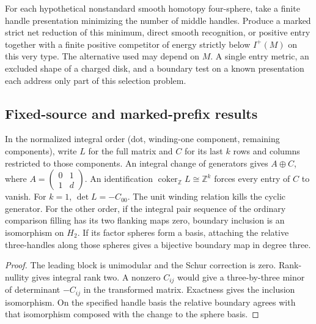 \begin{openproblem}
\label{ed04:coverage}
For each hypothetical nonstandard smooth homotopy four-sphere, take a
finite handle presentation minimizing the number of middle handles.
Produce a marked strict net reduction of this minimum, direct smooth
recognition, or positive entry together with a finite positive
competitor of energy strictly below $I^+(M)$ on this very type.
The alternative used may depend on $M$. A single entry metric, an
excluded shape of a charged disk, and a boundary test on a known
presentation each address only part of this selection problem.
\end{openproblem}

\subsection{Fixed-source and marked-prefix results}
\label{sec:ed04-fixed-source-results}

\begin{proposition}
\label{prop:ed04-integral-prefix}
\leanok
In the normalized integral order (dot, winding-one component, remaining
components), write $L$ for the full matrix and $C$ for its last $k$ rows
and columns restricted to those components. An integral change of generators
gives $A\oplus C$, where $A=\left(\begin{smallmatrix}0&1\\1&d\end{smallmatrix}\right)$.
An identification $\operatorname{coker}_{\mathbb Z}L\cong\mathbb Z^k$
forces every entry of $C$ to vanish. For $k=1$, $\det L=-C_{00}$.
The unit winding relation kills the cyclic generator. For the other order,
if the integral pair sequence of the ordinary comparison filling has its
two flanking maps zero, boundary inclusion is an isomorphism on $H_2$.
If its factor spheres form a basis, attaching the relative three-handles
along those spheres gives a bijective boundary map in degree three.
\end{proposition}
\begin{proof}
\leanok
The leading block is unimodular and the Schur correction is zero.
Rank-nullity gives integral rank two. A nonzero $C_{ij}$ would give a
three-by-three minor of determinant $-C_{ij}$ in the transformed matrix.
Exactness gives the inclusion isomorphism. On the specified handle basis
the relative boundary agrees with that isomorphism composed with the
change to the sphere basis.
\end{proof}


